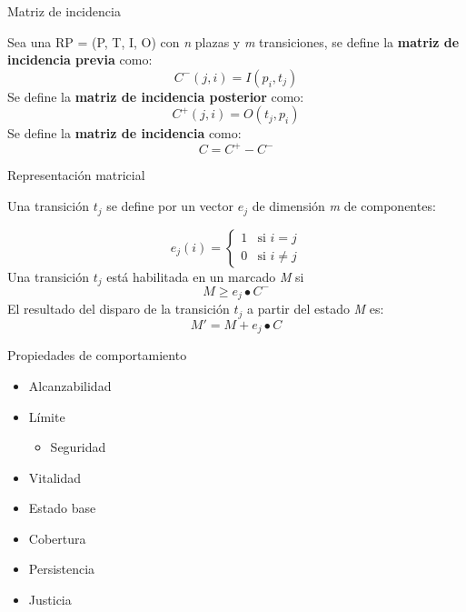 \documentclass[
compress,
xcolor=table,
dvipsnames,
]{beamer}
\begin{document}

\begin{frame}{Matriz de incidencia}

    Sea una RP = (P, T, I, O) con \textit{n} plazas y \textit{m} transiciones, se define la \textbf{matriz de incidencia previa} como: 
    \begin{equation}
        C^-(j, i) = I(p_i, t_j)
    \end{equation}
    Se define la \textbf{matriz de incidencia posterior} como:
    \begin{equation}
        C^+(j, i) = O(t_j, p_i)
    \end{equation}
    Se define la \textbf{matriz de incidencia} como:
    \begin{equation}
        C = C^+ - C^-
    \end{equation}
\end{frame}


\begin{frame}{Representación matricial}

    Una transición $t_j$ se define por un vector $e_j$ de dimensión \textit{m} de componentes:

        \[ e_j(i) =
          \begin{cases}
            1       & \text{si } i = j\\
            0       & \text{si } i \neq j
          \end{cases}
        \]
    Una transición $t_j$ está habilitada en un marcado \textit{M} si
    \begin{equation}
        M \geq e_j \bullet C^-
    \end{equation}
    El resultado del disparo de la transición $t_j$ a partir del estado \textit{M} es:
    \begin{equation}
        M' = M + e_j \bullet C
    \end{equation}

\end{frame}


\begin{frame}{Propiedades de comportamiento}
    \begin{itemize}
        \item{Alcanzabilidad}
        \item{Límite}
            \begin{itemize}
                \item{Seguridad}
            \end{itemize}
        \item{Vitalidad}
        \item{Estado base}
        \item{Cobertura}
        \item{Persistencia}
        \item{Justicia}
    \end{itemize}
\end{frame}
\end{document}
